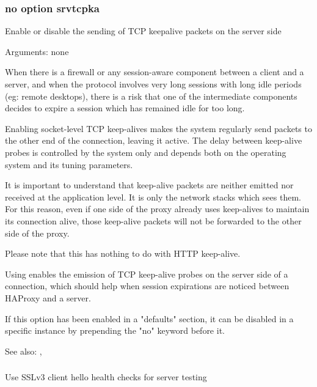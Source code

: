 \subsubsection*{no option srvtcpka}


  Enable or disable the sending of TCP keepalive packets on the server side


  Arguments: none

  When there is a firewall or any session-aware component between a client and
  a server, and when the protocol involves very long sessions with long idle
  periods (eg: remote desktops), there is a risk that one of the intermediate
  components decides to expire a session which has remained idle for too long.

  Enabling socket-level TCP keep-alives makes the system regularly send packets
  to the other end of the connection, leaving it active. The delay between
  keep-alive probes is controlled by the system only and depends both on the
  operating system and its tuning parameters.

  It is important to understand that keep-alive packets are neither emitted nor
  received at the application level. It is only the network stacks which sees
  them. For this reason, even if one side of the proxy already uses keep-alives
  to maintain its connection alive, those keep-alive packets will not be
  forwarded to the other side of the proxy.

  Please note that this has nothing to do with HTTP keep-alive.

  Using  enables the emission of TCP keep-alive probes on the
  server side of a connection, which should help when session expirations are
  noticed between HAProxy and a server.

  If this option has been enabled in a "defaults" section, it can be disabled
  in a specific instance by prepending the "no" keyword before it.


See also: , 

\subsubsection[ssl-hello-chk]{}


  Use SSLv3 client hello health checks for server testing

